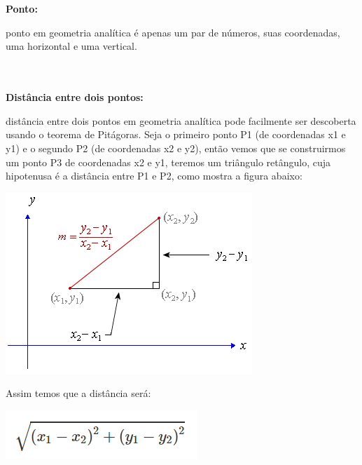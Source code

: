 \documentclass[a4paper,12pt]{article}
\begin{document}
\\~\\\noindent\textbf{Ponto:}

\noindentUm ponto em geometria analítica é apenas um par de números, suas coordenadas, uma horizontal e uma vertical.

\\~\\\noindent\textbf{Distância entre dois pontos:}

\noindentA distância entre dois pontos em geometria analítica pode facilmente ser descoberta usando o teorema de Pitágoras. Seja o primeiro ponto P1 (de coordenadas x1 e y1) e o segundo P2 (de coordenadas x2 e y2), então vemos que se construirmos um ponto P3 de coordenadas x2 e y1, teremos um triângulo retângulo, cuja hipotenusa é a distância entre P1 e P2, como mostra a figura abaixo:

\begin{center}
  \includegraphics[width=\linewidth/2]{figures/matematica_computacional/geometria_basica/distancia_entre_dois_pontos_1.png}
\end{center}

Assim temos que a distância será:

\begin{center}
  \includegraphics[width=\linewidth/3]{figures/matematica_computacional/geometria_basica/distancia_entre_dois_pontos_2.png}
\end{center}
\end{document}
